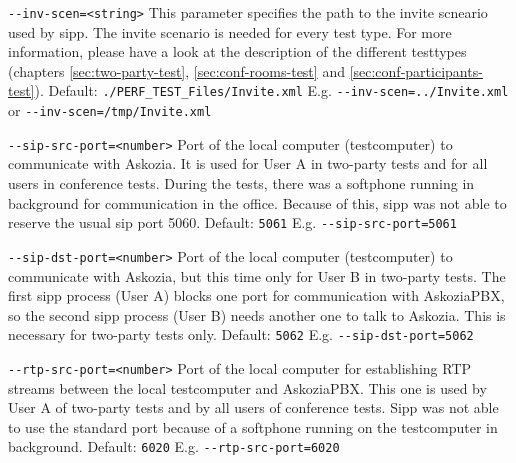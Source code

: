 \begin {description}
\item {\texttt{-{}-inv-scen=<string>}} \newline
This parameter specifies the path to the invite scneario used by sipp.
The invite scenario is needed for every test type.
For more information, please have a look at the description of the
different testtypes (chapters \ref{sec:two-party-test}, \ref{sec:conf-rooms-test} and \ref{sec:conf-participants-test}).
\newline Default: \texttt{./PERF\_TEST\_Files/Invite.xml}
\newline E.g. \texttt{-{}-inv-scen=../Invite.xml} or \texttt{-{}-inv-scen=/tmp/Invite.xml}

\item {\texttt{-{}-sip-src-port=<number>}} \newline
Port of the local computer (testcomputer) to communicate with Askozia.
It is used for User A in two-party tests and for all users in conference tests.
During the tests, there was a softphone running in background for communication
in the office. Because of this, sipp was not able to reserve the usual sip port 5060.
\newline Default: \texttt{5061}
\newline E.g. \texttt{-{}-sip-src-port=5061}

\item {\texttt{-{}-sip-dst-port=<number>}} \newline
Port of the local computer (testcomputer) to communicate with Askozia,
but this time only for User B in two-party tests. The first sipp process
(User A) blocks one port for communication with AskoziaPBX,
so the second sipp process (User B) needs another one to talk to Askozia.
This is necessary for two-party tests only.
\newline Default: \texttt{5062}
\newline E.g. \texttt{-{}-sip-dst-port=5062}

\item {\texttt{-{}-rtp-src-port=<number>}} \newline
Port of the local computer for establishing RTP streams between the local testcomputer
and AskoziaPBX. This one is used by User A of two-party tests and by all users of
conference tests. Sipp was not able to use the standard port because of a
softphone running on the testcomputer in background.
\newline Default: \texttt{6020}
\newline E.g. \texttt{-{}-rtp-src-port=6020}


\end{description}
